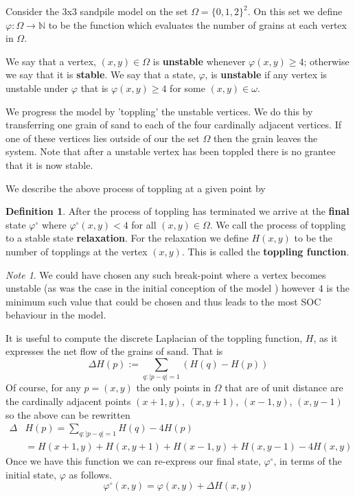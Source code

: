 \documentclass[12pt,a4paper]{amsart}
\newcommand{\N}{\mathbb{N}}
\theoremstyle{definition}
\newtheorem{defn}{Definition}[section]
\theoremstyle{remark}
\newtheorem*{note}{Note}
\begin{document}
\ex
Consider the 3x3 sandpile model on the set $\Omega=\{0,1,2\}^2$. On this set we define $\varphi:\Omega\to\N$ to be the function which evaluates the number of grains at each vertex in $\Omega$.

We say that a vertex, $(x,y)\in\Omega$ is \textbf{unstable} whenever $\varphi(x,y) \geq 4$; otherwise we say that it is \textbf{stable}. We say that a state, $\varphi$, is \textbf{unstable} if any vertex is unstable under $\varphi$ that is $\varphi(x,y) \geq 4$ for some $(x,y)\in \omega$.

We progress the model by 'toppling' the unstable vertices. We do this by transferring one grain of sand to each of the four cardinally adjacent vertices. If one of these vertices lies outside of our the set $\Omega$ then the grain leaves the system. Note that after a unstable vertex has been toppled there is no grantee that it is now stable.

We describe the above process of toppling at a given point by

\begin{defn}
After the process of toppling has terminated we arrive at the \textbf{final} state $\varphi^\circ$ where $\varphi^\circ(x,y)<4$ for all $(x,y)\in\Omega$. We call the process of toppling to a stable state \textbf{relaxation}. For the relaxation we define $H(x,y)$ to be the number of topplings at the vertex $(x,y)$. This is called the \textbf{toppling function}.
\end{defn}

\begin{note}
We could have chosen any such break-point where a vertex becomes unstable (as was the case in the initial conception of the model \cite{bak1987self}) however $4$ is the minimum such value that could be chosen and thus leads to the most SOC behaviour in the model.
\end{note}

It is useful to compute the discrete Laplacian of the toppling function, $H$, as it expresses the net flow of the grains of sand. That is
\begin{equation}
    \Delta H(p) := \sum_{q:|p-q|=1}(H(q)-H(p))
\end{equation}
Of course, for any $p=(x,y)$ the only points in $\Omega$ that are of unit distance are the cardinally adjacent points $(x+1,y)$, $(x,y+1)$, $(x-1,y)$, $(x,y-1)$ so the above can be rewritten
\begin{align*}
    \Delta& H(p) = \sum_{q:|p-q|=1}H(q) - 4H(p)\\
    &= H(x+1,y) + H(x,y+1) + H(x-1,y) + H(x,y-1) - 4H(x,y)
\end{align*}
Once we have this function we can re-express our final state, $\varphi^\circ$, in terms of the initial state, $\varphi$ as follows.
\begin{equation}
    \varphi^\circ(x,y) = \varphi(x,y) + \Delta H(x,y)
\end{equation}
\end{document}
